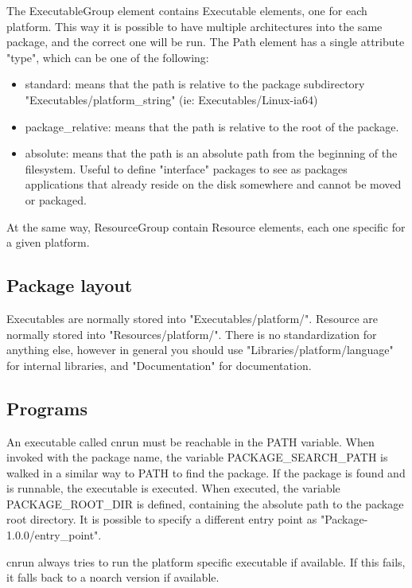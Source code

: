 The ExecutableGroup element contains Executable elements, one for each platform.
This way it is possible to have multiple architectures into the same package,
and the correct one will be run. The Path element has a single attribute
"type", which can be one of the following:
\begin{itemize}
\item standard: means that the path is relative to the package subdirectory "Executables/platform\_string" (ie: Executables/Linux-ia64)
\item package\_relative: means that the path is relative to the root of the package.
\item absolute: means that the path is an absolute path from the beginning of
      the filesystem. Useful to define "interface" packages to see as packages 
      applications that already reside on the disk somewhere and cannot be moved or packaged.
\end{itemize}

At the same way, ResourceGroup contain Resource elements, each one specific for a given platform.

\subsection{Package layout}

Executables are normally stored into "Executables/platform/". Resource are normally stored into "Resources/platform/".
There is no standardization for anything else, however in general you should use "Libraries/platform/language" for internal libraries,
and "Documentation" for documentation.

\subsection{Programs}

An executable called cnrun must be reachable in the PATH variable. When
invoked with the package name, the variable PACKAGE\_SEARCH\_PATH is walked in
a similar way to PATH to find the package.  If the package is found and is
runnable, the executable is executed. When executed, the variable
PACKAGE\_ROOT\_DIR is defined, containing the absolute path to the package root
directory.  It is possible to specify a different entry point as
"Package-1.0.0/entry\_point".

cnrun always tries to run the platform specific executable if available. If
this fails, it falls back to a noarch version if available.

